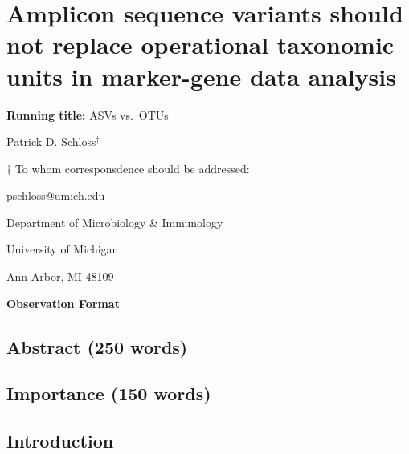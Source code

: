 \documentclass[
]{article}
\author{}
\date{\vspace{-2.5em}}
\begin{document}
\hypertarget{amplicon-sequence-variants-should-not-replace-operational-taxonomic-units-in-marker-gene-data-analysis}{%
\section{Amplicon sequence variants should not replace operational
taxonomic units in marker-gene data
analysis}\label{amplicon-sequence-variants-should-not-replace-operational-taxonomic-units-in-marker-gene-data-analysis}}

\vspace{20mm}

\textbf{Running title:} ASVs vs.~OTUs

\vspace{20mm}

Patrick D. Schloss\({^\dagger}\)

\vspace{40mm}

\({\dagger}\) To whom corresponsdence should be addressed:

\href{mailto:pschloss@umich.edu}{pschloss@umich.edu}

Department of Microbiology \& Immunology

University of Michigan

Ann Arbor, MI 48109

\vspace{20mm}

\textbf{Observation Format}

\newpage

\hypertarget{abstract-250-words}{%
\subsection{Abstract (250 words)}\label{abstract-250-words}}

\hypertarget{importance-150-words}{%
\subsection{Importance (150 words)}\label{importance-150-words}}

\newpage

\hypertarget{introduction}{%
\subsection{Introduction}\label{introduction}}
\end{document}
